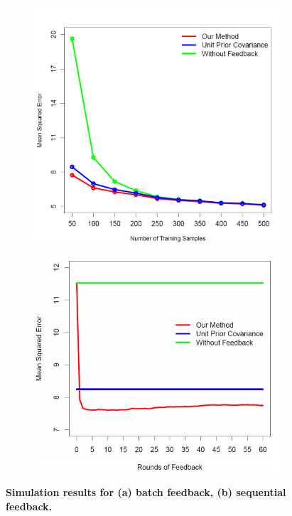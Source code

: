 \documentclass{sig-alternate}
\begin{document}
\begin{figure}[h!]
  \centering
  \begin{subfigure}[b]{0.4\linewidth}
    \includegraphics[width=\linewidth]{images/OBRAZOK_GRAF_A.png}
   \caption{}
  \end{subfigure}
  \begin{subfigure}[b]{0.4\linewidth}
    \includegraphics[width=\linewidth]{images/OBRAZOK_GRAF_B.png}
   \caption{}
  \end{subfigure}
 \caption{\textbf{ Simulation results for (a) batch feedback, (b) sequential
feedback.}}
  \label{obrazokgraf}
\end{figure}
\end{document}
